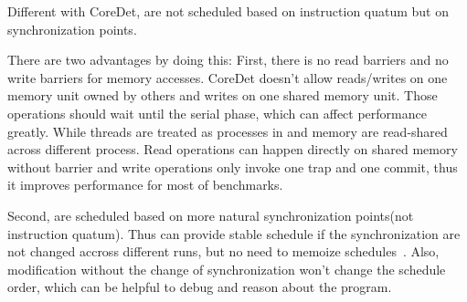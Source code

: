 Different with CoreDet, \dthreads{} are not scheduled based on instruction quatum 
but on synchronization points.  

There are two advantages by doing this:
First, there is no read barriers and no write barriers for memory accesses. 
CoreDet doesn't allow reads/writes on one memory unit owned by others and writes on one shared memory unit.
Those operations should wait until the serial phase, which can affect performance greatly. 
While threads are treated as processes in \dthreads{} and memory are read-shared across different process. 
Read operations can happen directly on shared memory without barrier and write operations only invoke one 
trap and one commit, thus it improves performance for most of benchmarks. 

Second, \dthreads{} are scheduled based on more natural synchronization points(not instruction quatum).
Thus \dthreads{} can provide stable schedule if the synchronization are not changed accross different runs, but 
no need to memoize schedules~\cite{stable-deterministic}.
Also, modification without the change of synchronization won't change the schedule order, which can be helpful to debug 
and reason about the program.


